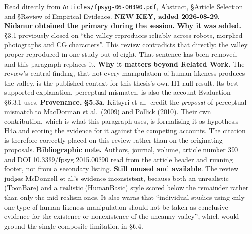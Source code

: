 \documentclass[11pt, a4paper]{article}
\begin{document}
\begin{Form}
  {Read directly from \texttt{\footnotesize Articles/fpsyg-06-00390.pdf}, Abstract, \S Article Selection and \S Review of Empirical Evidence. \textbf{NEW KEY, added 2026-08-29. Nidanur obtained the primary during the session.} \textbf{Why it was added.} \S3.1 previously closed on ``the valley reproduces reliably across robots, morphed photographs and CG characters''. This review contradicts that directly: the valley proper reproduced in one study out of eight. That sentence has been removed, and this paragraph replaces it. \textbf{Why it matters beyond Related Work.} The review's central finding, that not every manipulation of human likeness produces the valley, is the published context for this thesis's own H1 null result. Its best-supported explanation, perceptual mismatch, is also the account Evaluation \S6.3.1 uses. \textbf{Provenance, \S5.3a.} K\"{a}tsyri et al.\ credit the \emph{proposal} of perceptual mismatch to MacDorman et al.\ (2009) and Pollick (2010). Their own contribution, which is what this paragraph uses, is formalising it as hypothesis H4a and scoring the evidence for it against the competing accounts. The citation is therefore correctly placed on this review rather than on the originating proposals. \textbf{Bibliographic note.} Authors, journal, volume, article number 390 and DOI 10.3389/fpsyg.2015.00390 read from the article header and running footer, not from a secondary listing. \textbf{Still unused and available.} The review judges McDonnell et al.'s evidence inconsistent, because both an unrealistic (ToonBare) and a realistic (HumanBasic) style scored below the remainder rather than only the mid realism ones. It also warns that ``individual studies using only one type of human-likeness manipulation should not be taken as conclusive evidence for the existence or nonexistence of the uncanny valley'', which would ground the single-composite limitation in \S6.4.}



\end{Form}
\end{document}
